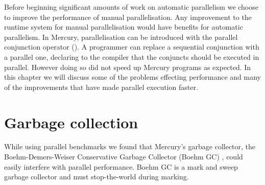 
    
Before beginning significant amounts of work on automatic parallelism we
choose to improve the performance of manual parallelisation.
Any improvement to the runtime system for manual parallelisation would have
benefits for automatic parallelism.
In Mercury, parallelisation can be introduced with the parallel conjunction
operator (\code{\&}).
A programmer can replace a sequential conjunction with a parallel one,
declaring to the compiler that the conjuncts should be executed in parallel.
However doing so did not speed up Mercury programs as expected.
In this chapter we will discuss
some of the problems effecting performance and
many of the improvements that have made parallel execution faster.

\section{Garbage collection}


While using parallel benchmarks we found that Mercury's garbage collector,
the Boehm-Demers-Weiser Conservative Garbage Collector (Boehm GC)
\citep{boehm_gc},
could easily interfere with parallel performance.
Boehm GC is a mark and sweep garbage collector and must
stop-the-world during marking.

